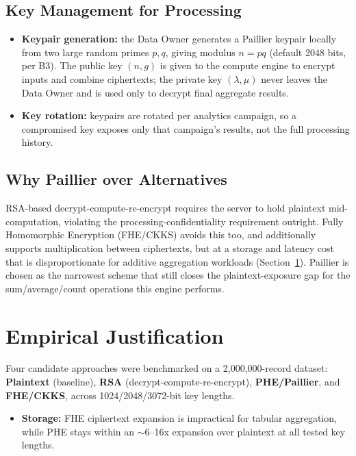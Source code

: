 \documentclass[11pt]{article}
\begin{document}
\subsection{Key Management for Processing}
\begin{itemize}[leftmargin=1.5em]
    \item \textbf{Keypair generation:} the Data Owner generates a Paillier keypair locally from two large random primes $p, q$, giving modulus $n = pq$ (default 2048 bits, per B3). The public key $(n, g)$ is given to the compute engine to encrypt inputs and combine ciphertexts; the private key $(\lambda, \mu)$ never leaves the Data Owner and is used only to decrypt final aggregate results.
    \item \textbf{Key rotation:} keypairs are rotated per analytics campaign, so a compromised key exposes only that campaign's results, not the full processing history.
\end{itemize}

\subsection{Why Paillier over Alternatives}
RSA-based decrypt-compute-re-encrypt requires the server to hold plaintext mid-computation, violating the processing-confidentiality requirement outright. Fully Homomorphic Encryption (FHE/CKKS) avoids this too, and additionally supports multiplication between ciphertexts, but at a storage and latency cost that is disproportionate for additive aggregation workloads (Section~\ref{sec:empirical}). Paillier is chosen as the narrowest scheme that still closes the plaintext-exposure gap for the sum/average/count operations this engine performs.

\section{Empirical Justification}
\label{sec:empirical}
Four candidate approaches were benchmarked on a 2,000,000-record dataset: \textbf{Plaintext} (baseline), \textbf{RSA} (decrypt-compute-re-encrypt), \textbf{PHE/Paillier}, and \textbf{FHE/CKKS}, across 1024/2048/3072-bit key lengths.

\begin{itemize}[leftmargin=1.5em]
    \item \textbf{Storage:} FHE ciphertext expansion is impractical for tabular aggregation, while PHE stays within an $\sim$6--16x expansion over plaintext at all tested key lengths.
\end{itemize}
\end{document}
